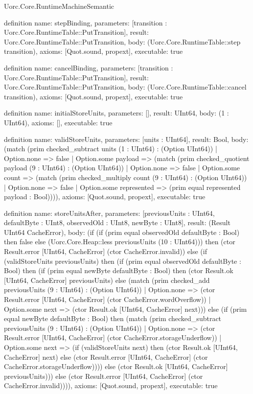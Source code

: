 \begin{lexlean}{Uorc.Core.RuntimeMachineSemantic}
\begin{semanticmodule}
definition{
  name: stepBinding,
  parameters: [transition : Uorc.Core.RuntimeTable::PutTransition],
  result: Uorc.Core.RuntimeTable::PutTransition,
  body: (Uorc.Core.RuntimeTable::step transition),
  axioms: [Quot.sound, propext],
  executable: true
}

definition{
  name: cancelBinding,
  parameters: [transition : Uorc.Core.RuntimeTable::PutTransition],
  result: Uorc.Core.RuntimeTable::PutTransition,
  body: (Uorc.Core.RuntimeTable::cancel transition),
  axioms: [Quot.sound, propext],
  executable: true
}

definition{
  name: initialStoreUnits,
  parameters: [],
  result: UInt64,
  body: (1 : UInt64),
  axioms: [],
  executable: true
}

definition{
  name: validStoreUnits,
  parameters: [units : UInt64],
  result: Bool,
  body: (match (prim checked_subtract units (1 : UInt64) : (Option UInt64))
    | Option.none => false
    | Option.some payload => (match (prim checked_quotient payload (9 : UInt64) : (Option UInt64))
      | Option.none => false
      | Option.some count => (match (prim checked_multiply count (9 : UInt64) : (Option UInt64))
        | Option.none => false
        | Option.some represented => (prim equal represented payload : Bool)))),
  axioms: [Quot.sound, propext],
  executable: true
}

definition{
  name: storeUnitsAfter,
  parameters: [previousUnits : UInt64, defaultByte : UInt8, observedOld : UInt8, newByte : UInt8],
  result: (Result UInt64 CacheError),
  body: (if (if (prim equal observedOld defaultByte : Bool) then false else (Uorc.Core.Heap::less previousUnits (10 : UInt64))) then (ctor Result.error [UInt64, CacheError] (ctor CacheError.invalid)) else (if (validStoreUnits previousUnits) then (if (prim equal observedOld defaultByte : Bool) then (if (prim equal newByte defaultByte : Bool) then (ctor Result.ok [UInt64, CacheError] previousUnits) else (match (prim checked_add previousUnits (9 : UInt64) : (Option UInt64))
    | Option.none => (ctor Result.error [UInt64, CacheError] (ctor CacheError.wordOverflow))
    | Option.some next => (ctor Result.ok [UInt64, CacheError] next))) else (if (prim equal newByte defaultByte : Bool) then (match (prim checked_subtract previousUnits (9 : UInt64) : (Option UInt64))
    | Option.none => (ctor Result.error [UInt64, CacheError] (ctor CacheError.storageUnderflow))
    | Option.some next => (if (validStoreUnits next) then (ctor Result.ok [UInt64, CacheError] next) else (ctor Result.error [UInt64, CacheError] (ctor CacheError.storageUnderflow)))) else (ctor Result.ok [UInt64, CacheError] previousUnits))) else (ctor Result.error [UInt64, CacheError] (ctor CacheError.invalid)))),
  axioms: [Quot.sound, propext],
  executable: true
}


\end{semanticmodule}
\end{lexlean}

